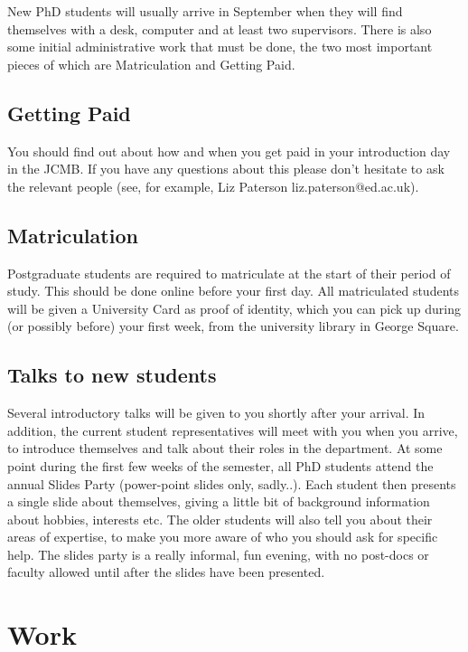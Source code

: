 New PhD students will usually arrive in September when they will find themselves with
a desk, computer and at least two supervisors. There is
also some initial administrative work that must be done, the two
most important pieces of which are Matriculation and Getting Paid.

\subsection{Getting Paid}


You should find out about how and when you get paid in your introduction day in the JCMB.
If you have any questions about this please don't hesitate to ask the relevant people
(see, for example, Liz Paterson liz.paterson@ed.ac.uk).

\subsection{Matriculation}


Postgraduate students are required to matriculate at the start of
their period of study. This should be done online before your first day. All matriculated students will be given a University Card as proof of identity, which you can pick up during (or possibly before) your first week, from the university library in George Square.

\subsection{Talks to new students}

Several introductory talks will be given to you shortly after
your arrival. In addition, the current student representatives will meet with you when you arrive, to introduce themselves and talk about their roles in the department. At some point during the first few weeks of the semester, all PhD students attend the annual Slides Party (power-point slides only, sadly..). Each student then presents a single slide about themselves, giving a little bit of background information about hobbies, interests etc. The older students will also tell you about their areas of expertise, to make you more aware of who you should ask for specific help. The slides party is a really informal, fun evening, with no post-docs or faculty allowed until after the slides have been presented.

\section{Work}

